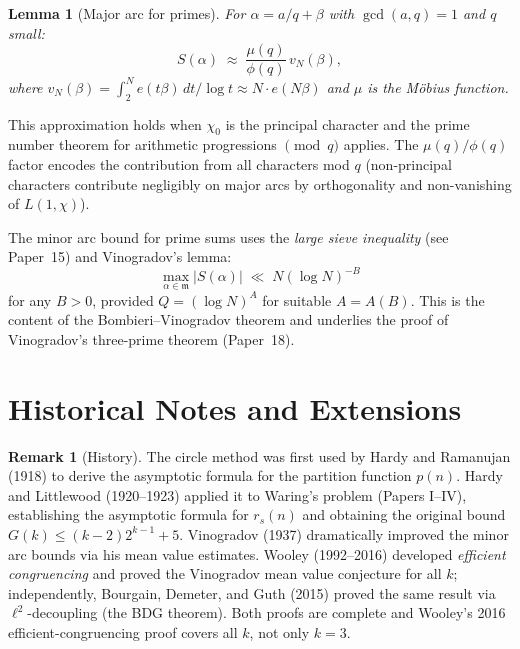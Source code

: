 \documentclass[12pt,a4paper]{amsart}
\newtheorem{lemma}[theorem]{Lemma}
\theoremstyle{definition}
\newtheorem{remark}[theorem]{Remark}
\newcommand{\eq}[1]{e\!\left(#1\right)}
\begin{document}
\begin{lemma}[Major arc for primes]\label{lem:major_prime}
  For $\alpha = a/q + \beta$ with $\gcd(a, q) = 1$ and $q$ small:
  \[
    S(\alpha) \;\approx\; \frac{\mu(q)}{\phi(q)}\, v_N(\beta),
  \]
  where $v_N(\beta) = \int_2^N \eq{t\beta}\, dt / \log t \approx N\cdot \eq{N\beta}$
  and $\mu$ is the M\"obius function.
\end{lemma}

This approximation holds when $\chi_0$ is the principal character and
the prime number theorem for arithmetic progressions $\pmod{q}$ applies.
The $\mu(q)/\phi(q)$ factor encodes the contribution from all characters
mod $q$ (non-principal characters contribute negligibly on major arcs by
orthogonality and non-vanishing of $L(1,\chi)$).

The minor arc bound for prime sums uses the \emph{large sieve inequality}
(see Paper~15) and Vinogradov's lemma:
\[
  \max_{\alpha \in \mathfrak{m}} |S(\alpha)| \;\ll\; N(\log N)^{-B}
\]
for any $B > 0$, provided $Q = (\log N)^A$ for suitable $A = A(B)$.
This is the content of the Bombieri--Vinogradov theorem and underlies
the proof of Vinogradov's three-prime theorem (Paper~18).

\section{Historical Notes and Extensions}
\label{sec:history}

\begin{remark}[History]
  The circle method was first used by Hardy and Ramanujan (1918) to derive
  the asymptotic formula for the partition function $p(n)$.  Hardy and
  Littlewood (1920--1923) applied it to Waring's problem (Papers I--IV),
  establishing the asymptotic formula for $r_s(n)$ and obtaining the
  original bound $G(k) \leq (k-2)2^{k-1} + 5$.  Vinogradov (1937)
  dramatically improved the minor arc bounds via his mean value estimates.
  Wooley (1992--2016) developed \emph{efficient congruencing} and proved
  the Vinogradov mean value conjecture for all $k$; independently,
  Bourgain, Demeter, and Guth (2015) proved the same result via
  $\ell^2$-decoupling (the BDG theorem).  Both proofs are complete and
  Wooley's 2016 efficient-congruencing proof covers all $k$, not only $k=3$.
\end{remark}
\end{document}

